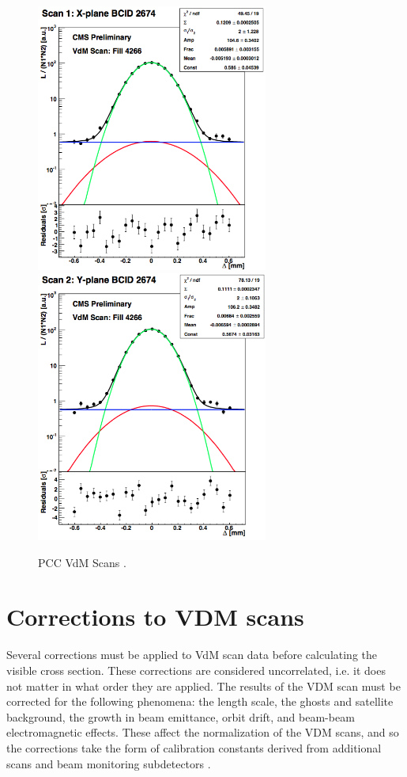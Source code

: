 \begin{figure}[]
\begin{centering}
\includegraphics[width=3in]{Chapter4/importfigs/CMS-PAS-LUM-15-001_Figure_005-a.png}
\includegraphics[width=3in]{Chapter4/importfigs/CMS-PAS-LUM-15-001_Figure_005-b.png}
\par\end{centering}
\caption{PCC VdM Scans \cite{CMS:2013gfa}. \label{fig:pccVdMScans}}
\end{figure}

\section{Corrections to VDM scans}

Several corrections must be applied to VdM scan data before calculating the visible cross section. These corrections are considered uncorrelated, i.e. it does not matter in what order they are applied. The results of the VDM scan must be corrected for the following phenomena: the length scale, the ghosts and satellite background, the growth in beam emittance, orbit drift, and beam-beam electromagnetic effects. These affect the normalization of the VDM scans, and so the corrections take the form of calibration constants derived from additional scans and beam monitoring subdetectors \cite{CMS:2013gfa}. 

